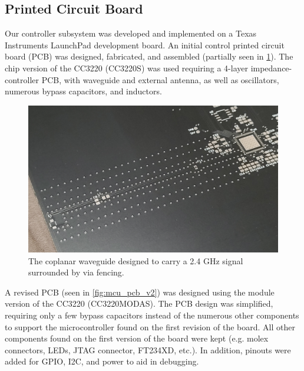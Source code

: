 \documentclass[journal]{IEEEtran}
\begin{document}
\subsection{Printed Circuit Board} Our controller subsystem was developed and implemented on a Texas Instruments LaunchPad development board. An initial control printed circuit board (PCB) was designed, fabricated, and assembled (partially seen in \ref{fig:mcu_v1_cpwg}). The chip version of the CC3220 (CC3220S) was used requiring a 4-layer impedance-controller PCB, with waveguide and external antenna, as well as oscillators, numerous bypass capacitors, and inductors.

\begin{figure}[H]
   \centering
   \label{fig:mcu_v1_cpwg}
   \includegraphics[width=\linewidth]{images/mcu_v1_cpwg.jpg}
   \caption{The coplanar waveguide designed to carry a 2.4 GHz signal surrounded by via fencing.}
\end{figure}

A revised PCB (seen in \ref{fig:mcu_pcb_v2}) was designed using the module version of the CC3220 (CC3220MODAS). The PCB design was simplified, requiring only a few bypass capacitors instead of the numerous other components to support the microcontroller found on the first revision of the board. All other components found on the first version of the board were kept (e.g. molex connectors, LEDs, JTAG connector, FT234XD, etc.). In addition, pinouts were added for GPIO, I2C, and power to aid in debugging.
\end{document}
